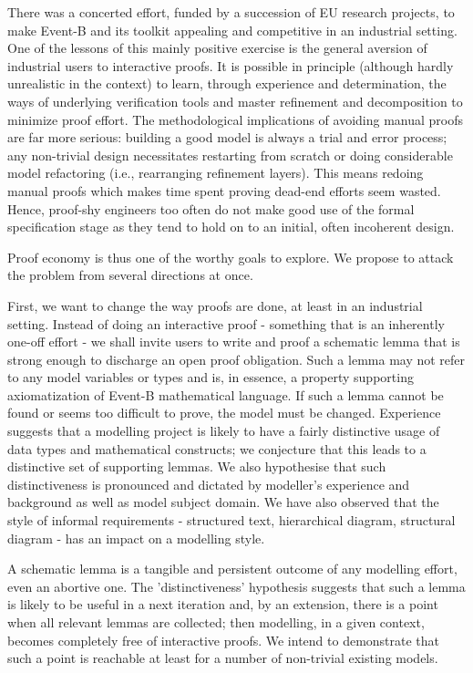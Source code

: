 \documentclass[twocolumn,a4paper,10pt]{article}
\begin{document}
There was a concerted effort, funded by a succession of EU research projects, to make Event-B and its toolkit appealing and competitive in an industrial setting. One of the lessons of this mainly positive exercise is the general aversion of industrial users to interactive proofs. It is possible in principle (although hardly unrealistic in the context) to learn, through experience and determination, the ways of underlying verification tools and master refinement and decomposition to minimize proof effort. The methodological implications of avoiding manual proofs are far more serious: building a good model is always a trial and error process; any non-trivial design necessitates restarting from scratch or doing considerable model refactoring (i.e., rearranging refinement layers). This means redoing manual proofs which makes time spent proving dead-end efforts seem wasted. Hence, proof-shy engineers too often do not make good use of the formal specification stage as they tend to hold on to an initial, often incoherent design. 

Proof economy is thus one of the worthy goals to explore. We propose to attack the problem from several directions at once. 

First, we want to change the way proofs are done, at least in an industrial setting. Instead of doing an interactive proof - something that is an inherently one-off effort - we shall invite users to write and proof a schematic lemma that is strong enough to discharge an open proof obligation. Such a lemma may not refer to any model variables or types and is, in essence, a property supporting axiomatization of Event-B mathematical language. If such a lemma cannot be found or seems too difficult to prove, the model must be changed. Experience suggests that a modelling project is likely to have a fairly distinctive usage of data types and mathematical constructs; we conjecture that this leads to a distinctive set of supporting lemmas. We also hypothesise that such distinctiveness is pronounced and dictated by modeller's experience and background as well as model subject domain. We have also observed that the style of informal requirements - structured text, hierarchical diagram, structural diagram - has an impact on a modelling style.

A schematic lemma is a tangible and persistent outcome of any modelling effort, even an abortive one. The 'distinctiveness' hypothesis suggests that such a lemma is likely to be useful in a next iteration and, by an extension, there is a point when all relevant lemmas are collected; then modelling, in a given context, becomes completely free of interactive proofs. We intend to demonstrate that such a point is reachable at least for a number of non-trivial existing models. 
\end{document}
